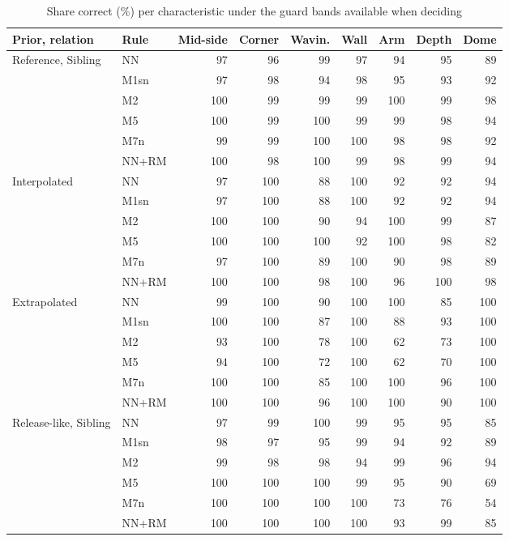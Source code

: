 \documentclass[pdflatex,sn-basic]{sn-jnl}
\newcommand{\tabsizesmall}{\footnotesize}
\begin{document}
\begin{table}[p]
\tabsizesmall
\setlength{\tabcolsep}{3pt}
\caption{Share correct (\%) per characteristic under the guard bands available when deciding}\label{tab:s-guard-qc}
\begin{tabular}{@{}llrrrrrrr@{}}
\toprule
Prior, relation & Rule & Mid-side & Corner & Wavin. & Wall & Arm & Depth & Dome \\
\midrule
Reference, Sibling & NN & 97 & 96 & 99 & 97 & 94 & 95 & 89 \\
 & M1sn & 97 & 98 & 94 & 98 & 95 & 93 & 92 \\
 & M2 & 100 & 99 & 99 & 99 & 100 & 99 & 98 \\
 & M5 & 100 & 99 & 100 & 99 & 99 & 98 & 94 \\
 & M7n & 99 & 99 & 100 & 100 & 98 & 98 & 92 \\
 & NN+RM & 100 & 98 & 100 & 99 & 98 & 99 & 94 \\
Interpolated & NN & 97 & 100 & 88 & 100 & 92 & 92 & 94 \\
 & M1sn & 97 & 100 & 88 & 100 & 92 & 92 & 94 \\
 & M2 & 100 & 100 & 90 & 94 & 100 & 99 & 87 \\
 & M5 & 100 & 100 & 100 & 92 & 100 & 98 & 82 \\
 & M7n & 97 & 100 & 89 & 100 & 90 & 98 & 89 \\
 & NN+RM & 100 & 100 & 98 & 100 & 96 & 100 & 98 \\
Extrapolated & NN & 99 & 100 & 90 & 100 & 100 & 85 & 100 \\
 & M1sn & 100 & 100 & 87 & 100 & 88 & 93 & 100 \\
 & M2 & 93 & 100 & 78 & 100 & 62 & 73 & 100 \\
 & M5 & 94 & 100 & 72 & 100 & 62 & 70 & 100 \\
 & M7n & 100 & 100 & 85 & 100 & 100 & 96 & 100 \\
 & NN+RM & 100 & 100 & 96 & 100 & 100 & 90 & 100 \\
Release-like, Sibling & NN & 97 & 99 & 100 & 99 & 95 & 95 & 85 \\
 & M1sn & 98 & 97 & 95 & 99 & 94 & 92 & 89 \\
 & M2 & 99 & 98 & 98 & 94 & 99 & 96 & 94 \\
 & M5 & 100 & 100 & 100 & 99 & 95 & 90 & 69 \\
 & M7n & 100 & 100 & 100 & 100 & 73 & 76 & 54 \\
 & NN+RM & 100 & 100 & 100 & 100 & 93 & 99 & 85 \\

\end{tabular}
\end{table}
\end{document}
